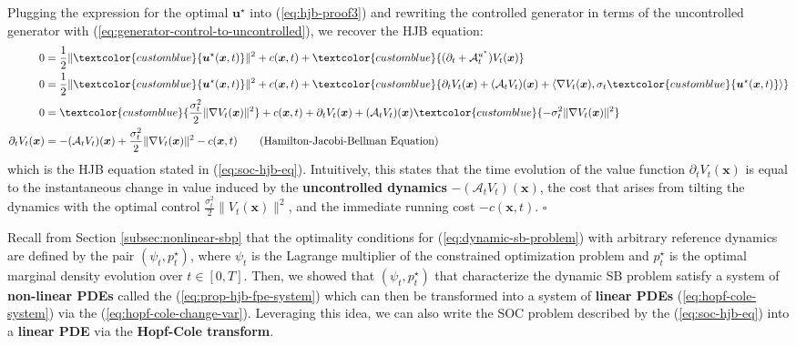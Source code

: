 \documentclass{article}
\newcommand{\boldtext}[1]{\textbf{\textcolor{MyGreen}{#1}}}
\newcommand{\bluetext}[1]{\textcolor{customblue}{#1}}
\begin{document}
Plugging the expression for the optimal $\boldsymbol{u}^\star$ into (\ref{eq:hjb-proof3}) and rewriting the controlled generator in terms of the uncontrolled generator with (\ref{eq:generator-control-to-uncontrolled}), we recover the HJB equation: 
\begin{align}
    0&=\frac{1}{2}\|\bluetext{\boldsymbol{u}^\star(\boldsymbol{x},t)}\|^2+c(\boldsymbol{x},t)+\bluetext{(\partial_t+\mathcal{A}^{u^\star}_t)V_t(\boldsymbol{x})}\nonumber\\
    0&=\frac{1}{2}\|\bluetext{\boldsymbol{u}^\star(\boldsymbol{x},t)}\|^2+c(\boldsymbol{x},t)+\bluetext{\partial_tV_t(\boldsymbol{x})+(\mathcal{A}_tV_t)(\boldsymbol{x})+\langle \nabla V_t(\boldsymbol{x}), \sigma_t\bluetext{\boldsymbol{u}^\star(\boldsymbol{x},t)}\rangle}\nonumber\\
    0&=\bluetext{\frac{\sigma_t^2}{2}\|\nabla V_t(\boldsymbol{x})\|^2}+c(\boldsymbol{x},t)+\partial_tV_t(\boldsymbol{x})+(\mathcal{A}_tV_t)(\boldsymbol{x})\bluetext{-\sigma_t^2\|\nabla V_t(\boldsymbol{x})\|^2}\nonumber\\
    \partial_tV_t(\boldsymbol{x})&=-(\mathcal{A}_tV_t)(\boldsymbol{x})+\frac{\sigma_t^2}{2}\|\nabla V_t(\boldsymbol{x})\|^2-c(\boldsymbol{x},t)\tag{Hamilton-Jacobi-Bellman Equation}
\end{align}
which is the HJB equation stated in (\ref{eq:soc-hjb-eq}). Intuitively, this states that the time evolution of the value function $\partial_tV_t(\boldsymbol{x})$ is equal to the instantaneous change in value induced by the \textbf{uncontrolled dynamics} $-(\mathcal{A}_tV_t)(\boldsymbol{x})$, the cost that arises from tilting the dynamics with the optimal control $\frac{\sigma_t^2}{2}\|V_t(\boldsymbol{x})\|^2$, and the immediate running cost $-c(\boldsymbol{x},t)$. \hfill $\square$

Recall from Section \ref{subsec:nonlinear-sbp} that the optimality conditions for (\ref{eq:dynamic-sb-problem}) with arbitrary reference dynamics are defined by the pair $(\psi_t, p^\star_t)$, where $\psi_t$ is the Lagrange multiplier of the constrained optimization problem and $p^\star_t$ is the optimal marginal density evolution over $t\in[0,T]$. Then, we showed that $(\psi_t, p_t^\star)$ that characterize the dynamic SB problem satisfy a system of \textbf{non-linear PDEs} called the (\ref{eq:prop-hjb-fpe-system}) which can then be transformed into a system of \textbf{linear PDEs} (\ref{eq:hopf-cole-system}) via the (\ref{eq:hopf-cole-change-var}). Leveraging this idea, we can also write the SOC problem described by the (\ref{eq:soc-hjb-eq}) into a \textbf{linear PDE} via the \boldtext{Hopf-Cole transform}.
\end{document}

